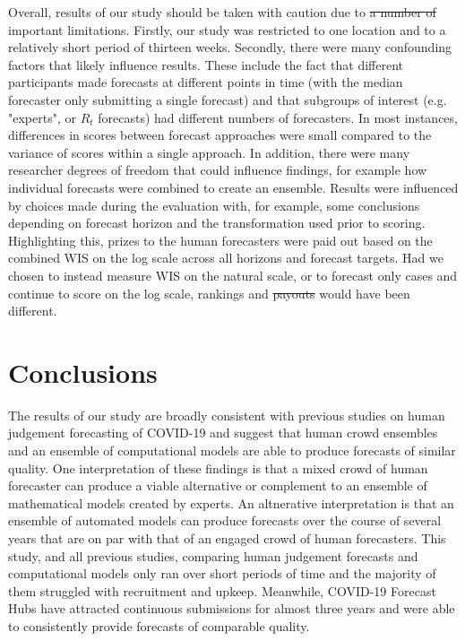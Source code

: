 \documentclass[10pt,a4paper,twocolumn]{article}
\providecommand{\DIFaddtex}[1]{{\protect\color{blue}\uwave{#1}}} %
\providecommand{\DIFdeltex}[1]{{\protect\color{red}\sout{#1}}}                      %
\providecommand{\DIFaddbegin}{} %
\providecommand{\DIFaddend}{} %
\providecommand{\DIFdelbegin}{} %
\providecommand{\DIFdelend}{} %
\providecommand{\DIFadd}[1]{\texorpdfstring{\DIFaddtex{#1}}{#1}} %
\providecommand{\DIFdel}[1]{\texorpdfstring{\DIFdeltex{#1}}{}} %
\begin{document}
\DIFaddend %
Overall, results of our study should be taken with caution due to \DIFdelbegin \DIFdel{a number of }\DIFdelend \DIFaddbegin \DIFadd{several }\DIFaddend important limitations. Firstly, our study was restricted to one location and to a relatively short period of thirteen weeks. Secondly, there were many confounding factors that likely influence results. These include the fact that different participants made forecasts at different points in time (with the median forecaster only submitting a single forecast) and that subgroups of interest (e.g. "experts", or $R_t$ forecasts) had different numbers of forecasters. 
In most instances, differences in scores between forecast approaches were small compared to the variance of scores within a single approach. In addition, there were many researcher degrees of freedom that could influence findings, for example how individual forecasts were combined to create an ensemble. Results were influenced by choices made during the evaluation with, for example, some conclusions  depending on forecast horizon and the transformation used prior to scoring. 
Highlighting this, prizes to the human forecasters were paid out based on the combined WIS on the log scale across all horizons and forecast targets. Had we chosen to instead measure WIS on the natural scale, or to forecast only cases and continue to score on the log scale, rankings and \DIFdelbegin \DIFdel{payouts }\DIFdelend \DIFaddbegin \DIFadd{pay-outs }\DIFaddend would have been different. 


\section*{Conclusions}

The results of our study are broadly consistent with previous studies on human judgement forecasting of COVID-19 and suggest that human crowd ensembles and an ensemble of computational models are able to produce forecasts of similar quality. 
One interpretation of these findings is that a mixed crowd of human forecaster can produce a viable alternative or complement to an ensemble of mathematical models created by experts. An altnerative interpretation is that an ensemble of automated models can produce forecasts over the course of several years that are on par with that of an engaged crowd of human forecasters. This study, and all previous studies, comparing human judgement forecasts and computational models only ran over short periods of time and the majority of them struggled with recruitment and upkeep. Meanwhile, COVID-19 Forecast Hubs have attracted continuous submissions for almost three years and were able to consistently provide forecasts of comparable quality. 
\end{document}
